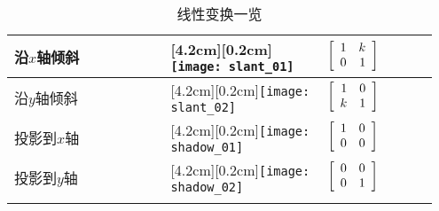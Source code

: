 \begin{longtable}{>{\raggedright}m{0.35\linewidth}>{\centering}m{0.35\linewidth}>{\centering\arraybackslash}m{0.25\linewidth}}
沿$x$轴倾斜 & \raisebox{0pt}[4.2cm][0.2cm]{\texttt{[image: slant\_01]}} & $\left[\begin{array}{r r} 1 & k\\ 0 & 1\end{array}\right]$\\\hline
沿$y$轴倾斜 & \raisebox{0pt}[4.2cm][0.2cm]{\texttt{[image: slant\_02]}} & $\left[\begin{array}{r r} 1 & 0\\ k & 1\end{array}\right]$\\\hline
投影到$x$轴 & \raisebox{0pt}[4.2cm][0.2cm]{\texttt{[image: shadow\_01]}} & $\left[\begin{array}{r r} 1 & 0\\ 0 & 0\end{array}\right]$\\\hline
投影到$y$轴 & \raisebox{0pt}[4.2cm][0.2cm]{\texttt{[image: shadow\_02]}} & $\left[\begin{array}{r r} 0 & 0\\ 0 & 1\end{array}\right]$\\\hline
\caption{线性变换一览}
\end{longtable}\vspace{6ex}


